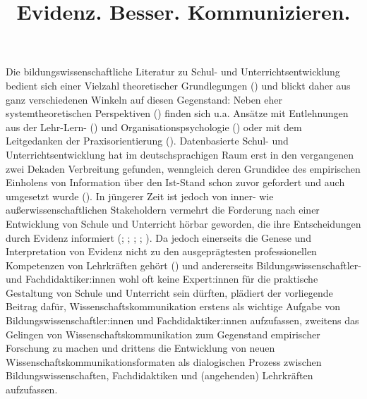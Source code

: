 \documentclass[
  man,
  floatsintext,
  longtable,
  nolmodern,
  notxfonts,
  notimes,
  colorlinks=true,linkcolor=blue,citecolor=blue,urlcolor=blue]{apa7}
\title{Evidenz. Besser. Kommunizieren.}
\begin{document}
\maketitle


\setcounter{secnumdepth}{-\maxdimen} %

\setlength\LTleft{0pt}


Die bildungswissenschaftliche Literatur zu Schul- und
Unterrichtsentwicklung bedient sich einer Vielzahl theoretischer
Grundlegungen () und blickt daher aus
ganz verschiedenen Winkeln auf diesen Gegenstand: Neben eher
systemtheoretischen Perspektiven () finden sich u.a. Ansätze mit Entlehnungen aus der
Lehr-Lern- () und
Organisationspsychologie () oder mit dem Leitgedanken der Praxisorientierung
(). Datenbasierte Schul-
und Unterrichtsentwicklung hat im deutschsprachigen Raum erst in den
vergangenen zwei Dekaden Verbreitung gefunden, wenngleich deren
Grundidee des empirischen Einholens von Information über den Ist-Stand
schon zuvor gefordert und auch umgesetzt wurde
(). In jüngerer
Zeit ist jedoch von inner- wie außerwissenschaftlichen Stakeholdern
vermehrt die Forderung nach einer Entwicklung von Schule und Unterricht
hörbar geworden, die ihre Entscheidungen durch Evidenz informiert
(; ; ; ; ). Da jedoch einerseits
die Genese und Interpretation von Evidenz nicht zu den ausgeprägtesten
professionellen Kompetenzen von Lehrkräften gehört
() und andererseits
Bildungswissenschaftler- und Fachdidaktiker:innen wohl oft keine
Expert:innen für die praktische Gestaltung von Schule und Unterricht
sein dürften, plädiert der vorliegende Beitrag dafür,
Wissenschaftskommunikation erstens als wichtige Aufgabe von
Bildungswissenschaftler:innen und Fachdidaktiker:innen aufzufassen,
zweitens das Gelingen von Wissenschaftskommunikation zum Gegenstand
empirischer Forschung zu machen und drittens die Entwicklung von neuen
Wissenschaftskommunikationsformaten als dialogischen Prozess zwischen
Bildungswissenschaften, Fachdidaktiken und (angehenden) Lehrkräften
aufzufassen.
\end{document}
